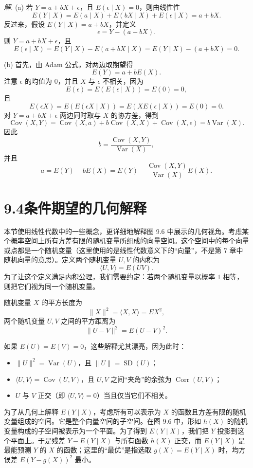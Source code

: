 \documentclass[UTF8, 12pt, fontset=fandol, oneside]{ctexart}
\begin{document}
\noindent\textit{解.}\quad
(a) 若 $Y=a+bX+\epsilon$，且 $E(\epsilon\mid X)=0$，则由线性性
\[
  E(Y\mid X)=E(a\mid X)+E(bX\mid X)+E(\epsilon\mid X)=a+bX.
\]
反过来，假设 $E(Y\mid X)=a+bX$，并定义
\[
  \epsilon=Y-(a+bX).
\]
则 $Y=a+bX+\epsilon$，且
\[
  E(\epsilon\mid X)=E(Y\mid X)-E(a+bX\mid X)=E(Y\mid X)-(a+bX)=0.
\]

(b) 首先，由 Adam 公式，对两边取期望得
\[
  E(Y)=a+bE(X).
\]
注意 $\epsilon$ 的均值为 $0$，并且 $X$ 与 $\epsilon$ 不相关，因为
\[
  E(\epsilon)=E(E(\epsilon\mid X))=E(0)=0,
\]
且
\[
  E(\epsilon X)=E(E(\epsilon X\mid X))=E(XE(\epsilon\mid X))=E(0)=0.
\]
对 $Y=a+bX+\epsilon$ 两边同时取与 $X$ 的协方差，得到
\[
  \operatorname{Cov}(X,Y)
  =\operatorname{Cov}(X,a)+b\operatorname{Cov}(X,X)+\operatorname{Cov}(X,\epsilon)
  =b\operatorname{Var}(X).
\]
因此
\[
  b=\frac{\operatorname{Cov}(X,Y)}{\operatorname{Var}(X)},
\]
并且
\[
  a=E(Y)-bE(X)
  =E(Y)-\frac{\operatorname{Cov}(X,Y)}{\operatorname{Var}(X)}E(X).
\]

\section*{9.4\quad *条件期望的几何解释}

本节使用线性代数中的一些概念，更详细地解释图 9.6 中展示的几何视角。考虑某个概率空间上所有方差有限的随机变量所组成的向量空间。这个空间中的每个向量或点都是一个随机变量（这里使用的是线性代数意义下的“向量”，不是第 7 章中随机向量的意思）。定义两个随机变量 $U,V$ 的内积为
\[
  \langle U,V\rangle=E(UV).
\]
为了让这个定义满足内积公理，我们需要约定：若两个随机变量以概率 $1$ 相等，则把它们视为同一个随机变量。

随机变量 $X$ 的平方长度为
\[
  \|X\|^2=\langle X,X\rangle=EX^2,
\]
两个随机变量 $U,V$ 之间的平方距离为
\[
  \|U-V\|^2=E(U-V)^2.
\]

如果 $E(U)=E(V)=0$，这些解释尤其漂亮，因为此时：
\begin{itemize}
  \item $\|U\|^2=\operatorname{Var}(U)$，且 $\|U\|=\operatorname{SD}(U)$；
  \item $\langle U,V\rangle=\operatorname{Cov}(U,V)$，且 $U,V$ 之间“夹角”的余弦为 $\operatorname{Corr}(U,V)$；
  \item $U$ 与 $V$ 正交（即 $\langle U,V\rangle=0$）当且仅当它们不相关。
\end{itemize}

为了从几何上解释 $E(Y\mid X)$，考虑所有可以表示为 $X$ 的函数且方差有限的随机变量组成的空间。它是整个向量空间的子空间。在图 9.6 中，形如 $h(X)$ 的随机变量构成的子空间被表示为一个平面。为了得到 $E(Y\mid X)$，我们把 $Y$ 投影到这个平面上。于是残差 $Y-E(Y\mid X)$ 与所有函数 $h(X)$ 正交，而 $E(Y\mid X)$ 是最能预测 $Y$ 的 $X$ 的函数；这里的“最优”是指选取 $g(X)=E(Y\mid X)$ 时，均方误差 $E(Y-g(X))^2$ 最小。
\end{document}

